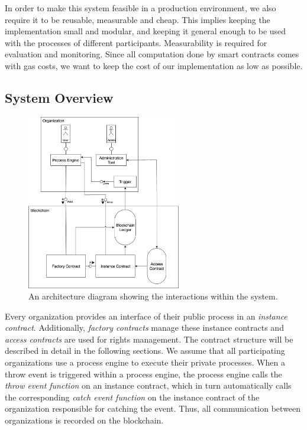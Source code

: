 \documentclass[runningheads]{llncs}
\begin{document}
In order to make this system feasible in a production environment, we also require it to be reusable, measurable and cheap.
This implies keeping the implementation small and modular, and keeping it general enough to be used with the processes of different participants.
Measurability is required for evaluation and monitoring.
Since all computation done by smart contracts comes with gas costs, we want to keep the cost of our implementation as low as possible.

\subsection{System Overview}
\begin{figure}
	\centering
	\includegraphics[width=0.6\textwidth]{fig/system_diagram.eps}
	\caption{An architecture diagram showing the interactions within the system.}
	\label{fig:system_diagram}
\end{figure}

Every organization provides an interface of their public process in an \emph{instance contract}.
Additionally, \emph{factory contracts} manage these instance contracts and \emph{access contracts} are used for rights management.
The contract structure will be described in detail in the following sections.
We assume that all participating organizations use a process engine to execute their private processes.
When a throw event is triggered within a process engine, the process engine calls the \emph{throw event function} on an instance contract, which in turn automatically calls the corresponding \emph{catch event function} on the instance contract of the organization responsible for catching the event.
Thus, all communication between organizations is recorded on the blockchain.
\end{document}
